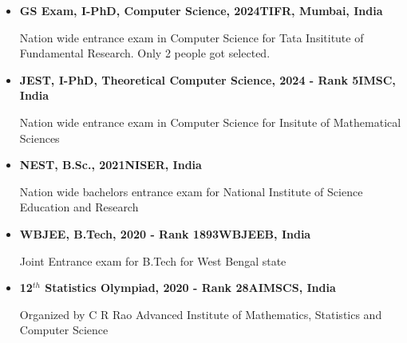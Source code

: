 \documentclass[10pt,a4paper,sans,colorlinks]{moderncv}        %
\begin{document}
\begin{itemize}
	\item \textbf{GS Exam, I-PhD, Computer Science, 2024\hfill TIFR, Mumbai, India}
	
	Nation wide entrance exam in Computer Science for Tata Insititute of Fundamental Research. Only 2 people got selected.
	\item \textbf{JEST, I-PhD, Theoretical Computer Science, 2024 - Rank 5\hfill IMSC, India}
	
	Nation wide entrance exam in Computer Science for Insitute of Mathematical Sciences

	\item \textbf{NEST, B.Sc., 2021\hfill NISER, India}
	
	Nation wide bachelors entrance exam for National Institute of Science Education and Research

	\item \textbf{WBJEE, B.Tech, 2020 - Rank 1893\hfill WBJEEB, India}
	
	Joint Entrance exam for B.Tech for West Bengal state
	\item \textbf{12$^{th}$ Statistics Olympiad, 2020 - Rank 28\hfill AIMSCS, India}
	
	Organized by C R Rao Advanced Institute of Mathematics, Statistics and Computer Science
\end{itemize}

\end{document}
